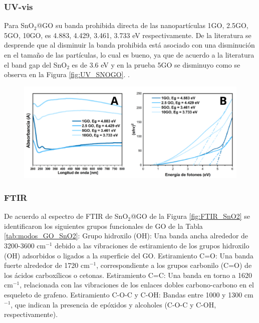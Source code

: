 \documentclass[12pt]{article}
\begin{document}
\subsubsection{UV-vis}
Para SnO$\displaystyle _{2}$@GO su banda prohibida directa de las nanopartículas 1GO, 2.5GO, 5GO, 10GO,  es 4.883, 4.429, 3.461, 3.733 eV respectivamente. De la literatura se desprende que al disminuir la banda prohibida está asociado con una disminución en el tamaño de las partículas, lo cual es bueno, ya que de acuerdo a la literatura el band gap del SnO$\displaystyle _{2}$ es de 3.6 eV y en la prueba 5GO se disminuyo como se observa en la Figura \ref{fig:UV_SNOGO}.  \cite{IEEEreferencias:Ref36}.
\begin{figure}[H]
    	   \begin{center}
     	  	\includegraphics[width = 1\textwidth]{Imagenes/UV_SNOGO.png}
    	   \end{center} 
        \end{figure}
    

\subsubsection{FTIR}
De acuerdo al espectro de FTIR de SnO$\displaystyle _{2}$@GO de la Figura \ref{fig:FTIR_SnO2} se identificaron los siguientes grupos funcionales de GO de la Tabla \ref{tab:modos_GO_SnO2}: 
Grupo hidroxilo (OH): Una banda ancha alrededor de 3200-3600 cm$\displaystyle ^{-1}$ debido a las vibraciones de estiramiento de los grupos hidroxilo (OH) adsorbidos o ligados a la superficie del GO.
Estiramiento C=O: Una banda fuerte alrededor de 1720 cm$\displaystyle ^{-1}$, correspondiente a los grupos carbonilo (C=O) de los ácidos carboxílicos o cetonas.
Estiramiento C=C: Una banda en torno a 1620 cm$\displaystyle ^{-1}$, relacionada con las vibraciones de los enlaces dobles carbono-carbono en el esqueleto de grafeno.
Estiramiento C-O-C y C-OH: Bandas entre 1000 y 1300 cm$\displaystyle ^{-1}$, que indican la presencia de epóxidos y alcoholes (C-O-C y C-OH, respectivamente).\vspace{1em} %
\end{document}
